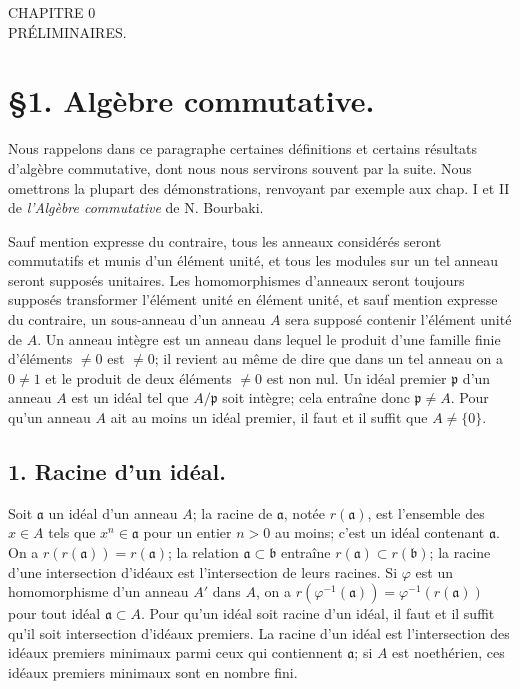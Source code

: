 
\noindent
\begin{center}
\large{CHAPITRE 0}\\
\large{PRÉLIMINAIRES.}
\end{center}

\section*{§1. Algèbre commutative.}

Nous rappelons dans ce paragraphe certaines définitions et certains résultats d'algèbre commutative, dont nous nous servirons souvent par la suite. Nous omettrons la plupart des démonstrations, renvoyant par exemple aux chap. I et II de \emph{l'Algèbre commutative} de N. Bourbaki.

Sauf mention expresse du contraire, tous les anneaux considérés seront commutatifs et munis d'un élément unité, et tous les modules sur un tel anneau seront supposés unitaires. Les homomorphismes d'anneaux seront toujours supposés transformer l'élément unité en élément unité, et sauf mention expresse du contraire, un sous-anneau d'un anneau $A$ sera supposé contenir l'élément unité de $A$. Un anneau intègre est un anneau dans lequel le produit d'une famille finie d'éléments $\neq 0$ est $\neq 0$; il revient au même de dire que dans un tel anneau on a $0 \neq 1$ et le produit de deux éléments $\neq 0$ est non nul. Un idéal premier $\mathfrak{p}$ d'un anneau $A$ est un idéal tel que $A/\mathfrak{p}$ soit intègre; cela entraîne donc $\mathfrak{p} \neq A$. Pour qu'un anneau $A$ ait au moins un idéal premier, il faut et il suffit que $A \neq \{0\}$.

\subsection*{1. Racine d'un idéal.}

Soit $\mathfrak{a}$ un idéal d'un anneau $A$; la racine de $\mathfrak{a}$, notée $r(\mathfrak{a})$, est l'ensemble des $x \in A$ tels que $x^n \in \mathfrak{a}$ pour un entier $n > 0$ au moins; c'est un idéal contenant $\mathfrak{a}$. On a $r(r(\mathfrak{a})) = r(\mathfrak{a})$; la relation $\mathfrak{a} \subset \mathfrak{b}$ entraîne $r(\mathfrak{a}) \subset r(\mathfrak{b})$; la racine d'une intersection d'idéaux est l'intersection de leurs racines. Si $\varphi$ est un homomorphisme d'un anneau $A'$ dans $A$, on a $r(\varphi^{-1}(\mathfrak{a})) = \varphi^{-1}(r(\mathfrak{a}))$ pour tout idéal $\mathfrak{a} \subset A$. Pour qu'un idéal soit racine d'un idéal, il faut et il suffit qu'il soit intersection d'idéaux premiers. La racine d'un idéal est l'intersection des idéaux premiers minimaux parmi ceux qui contiennent $\mathfrak{a}$; si $A$ est noethérien, ces idéaux premiers minimaux sont en nombre fini.

